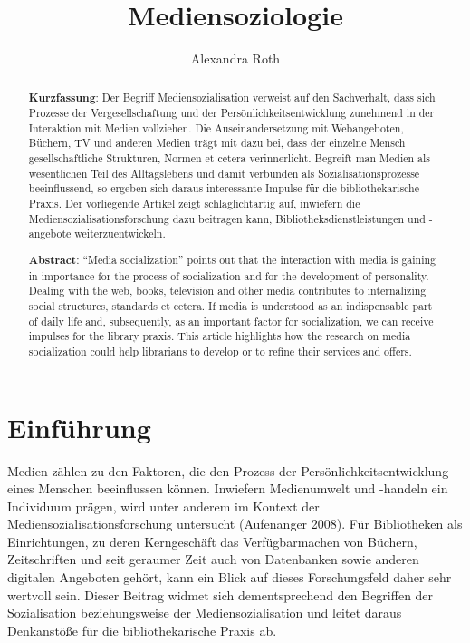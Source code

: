 \documentclass[a4paper,
fontsize=11pt,
oneside,
numbers=noperiodatend,
parskip=half-,
bibliography=totoc,
final
]{scrartcl}
\title{\LARGE{Mediensoziologie}}%
\author{Alexandra Roth} %
\date{}
\begin{document}
\maketitle
\thispagestyle{fancyplain} 

\begin{abstract}
\noindent
\textbf{Kurzfassung}: Der Begriff Mediensozialisation verweist auf den
Sachverhalt, dass sich Prozesse der Vergesellschaftung und der
Persönlichkeitsentwicklung zunehmend in der Interaktion mit Medien
vollziehen. Die Auseinandersetzung mit Webangeboten, Büchern, TV und
anderen Medien trägt mit dazu bei, dass der einzelne Mensch
gesellschaftliche Strukturen, Normen et cetera verinnerlicht. Begreift
man Medien als wesentlichen Teil des Alltagslebens und damit verbunden
als Sozialisationsprozesse beeinflussend, so ergeben sich daraus
interessante Impulse für die bibliothekarische Praxis. Der vorliegende
Artikel zeigt schlaglichtartig auf, inwiefern die
Mediensozialisationsforschung dazu beitragen kann,
Bibliotheksdienstleistungen und -angebote weiterzuentwickeln.

\textbf{Abstract}: \enquote{Media socialization} points out that the
interaction with media is gaining in importance for the process of
socialization and for the development of personality. Dealing with the
web, books, television and other media contributes to internalizing
social structures, standards et cetera. If media is understood as an
indispensable part of daily life and, subsequently, as an important
factor for socialization, we can receive impulses for the library
praxis. This article highlights how the research on media socialization
could help librarians to develop or to refine their services and offers.
\end{abstract}

\hypertarget{einfuxfchrung}{%
\section{Einführung}\label{einfuxfchrung}}

Medien zählen zu den Faktoren, die den Prozess der
Persönlichkeitsentwicklung eines Menschen beeinflussen können. Inwiefern
Medienumwelt und -handeln ein Individuum prägen, wird unter anderem im
Kontext der Mediensozialisationsforschung untersucht (Aufenanger 2008).
Für Bibliotheken als Einrichtungen, zu deren Kerngeschäft das
Verfügbarmachen von Büchern, Zeitschriften und seit geraumer Zeit auch
von Datenbanken sowie anderen digitalen Angeboten gehört, kann ein Blick
auf dieses Forschungsfeld daher sehr wertvoll sein. Dieser Beitrag
widmet sich dementsprechend den Begriffen der Sozialisation
beziehungsweise der Mediensozialisation und leitet daraus Denkanstöße
für die bibliothekarische Praxis ab.
\end{document}

